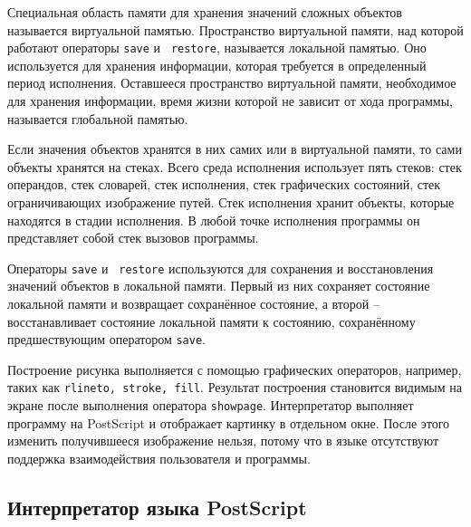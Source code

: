 \documentclass[14pt]{matmex-diploma}
\begin{document}
Специальная область памяти для хранения значений сложных объектов называется виртуальной памятью. Пространство виртуальной памяти, над которой работают операторы \texttt{save} и \texttt{ restore}, называется локальной памятью. Оно используется для хранения информации, которая требуется в определенный период исполнения. Оставшееся пространство виртуальной памяти, необходимое для хранения информации, время жизни которой не зависит от хода программы, называется глобальной памятью.

Если значения объектов хранятся в них самих или в виртуальной памяти, то сами объекты хранятся на стеках. Всего среда исполнения использует пять стеков: стек операндов, стек словарей, стек исполнения, стек графических состояний, стек ограничивающих изображение путей. Стек исполнения хранит объекты, которые находятся в стадии исполнения. В любой точке исполнения программы он представляет собой стек вызовов программы.

Операторы \texttt{save} и \texttt{ restore} используются для сохранения и восстановления значений объектов в локальной памяти. Первый из них сохраняет состояние локальной памяти и возвращает сохранённое состояние, а второй -- восстанавливает  состояние локальной памяти к состоянию, сохранённому предшествующим оператором \texttt{save}.


Построение рисунка выполняется с помощью графических операторов, например, таких как \texttt{rlineto, stroke, fill}. Результат построения становится видимым на экране после выполнения оператора \texttt{showpage}. Интерпретатор выполняет программу на PostScript и отображает картинку в отдельном окне. После этого изменить получившееся изображение нельзя, потому что в языке отсутствуют поддержка взаимодействия пользователя и программы.





\subsection{Интерпретатор языка PostScript}
\end{document}

